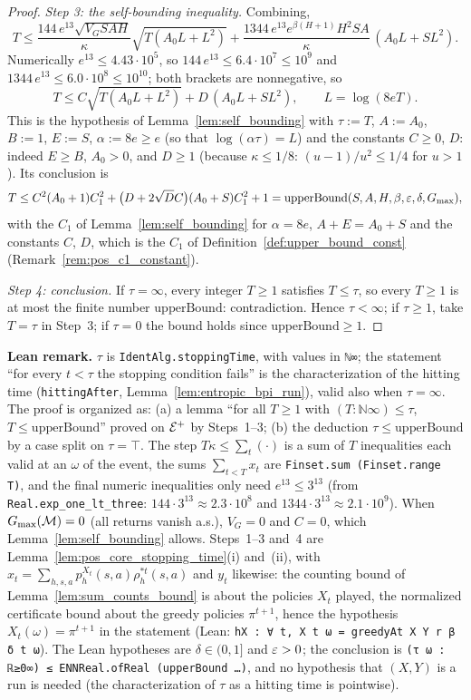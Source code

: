\begin{proof}
\emph{Step 3: the self-bounding inequality.} Combining,
\[
  T \le \frac{144\,e^{13}\sqrt{V_G SAH}}{\kappa}\sqrt{T(A_0L + L^2)}
     + \frac{1344\,e^{13}e^{\beta(H+1)}H^2SA}{\kappa}\,(A_0L + SL^2) .
\]
Numerically $e^{13} \le 4.43\cdot 10^5$, so $144\,e^{13} \le 6.4\cdot 10^7 \le 10^9$ and
$1344\,e^{13} \le 6.0\cdot 10^8 \le 10^{10}$; both brackets are nonnegative, so
\[
  T \le C\sqrt{T(A_0L + L^2)} + D\,(A_0L + SL^2), \qquad L = \log(8eT) .
\]
This is the hypothesis of Lemma~\ref{lem:self_bounding} with $\tau := T$, $A := A_0$, $B := 1$,
$E := S$, $\alpha := 8e \ge e$ (so that $\log(\alpha\tau) = L$) and the constants $C \ge 0$, $D$: indeed
$E \ge B$, $A_0 > 0$, and $D \ge 1$ (because $\kappa \le 1/8$: $(u - 1)/u^2 \le 1/4$ for $u > 1$).
Its conclusion is
\[
  T \le C^2(A_0 + 1)C_1^2 + \big(D + 2\sqrt{D}C\big)(A_0 + S)C_1^2 + 1 = \mathrm{upperBound}(S,A,H,\beta,\varepsilon,\delta,G_{\max}),
\]
with the $C_1$ of Lemma~\ref{lem:self_bounding} for $\alpha = 8e$, $A + E = A_0 + S$ and the constants
$C$, $D$, which is the $C_1$ of Definition~\ref{def:upper_bound_const} (Remark~\ref{rem:pos_c1_constant}).

\emph{Step 4: conclusion.} If $\tau = \infty$, every integer $T \ge 1$ satisfies $T \le \tau$, so every
$T \ge 1$ is at most the finite number $\mathrm{upperBound}$: contradiction. Hence $\tau < \infty$; if
$\tau \ge 1$, take $T = \tau$ in Step~3; if $\tau = 0$ the bound holds since $\mathrm{upperBound} \ge 1$.
\end{proof}

\textbf{Lean remark.} $\tau$ is \texttt{IdentAlg.stoppingTime}, with values in \texttt{ℕ∞}; the
statement ``for every $t < \tau$ the stopping condition fails'' is the characterization of the
hitting time (\texttt{hittingAfter}, Lemma~\ref{lem:entropic_bpi_run}), valid also when $\tau = \infty$.
The proof is organized as: (a) a lemma ``for all $T \ge 1$ with $(T : \texttt{ℕ∞}) \le \tau$,
$T \le \mathrm{upperBound}$'' proved on $\mathcal{E}^+$ by Steps~1--3; (b) the deduction $\tau \le \mathrm{upperBound}$
by a case split on $\tau = \top$. The step $T\kappa \le \sum_t(\cdot)$ is a sum of $T$ inequalities each
valid at an $\omega$ of the event, the sums $\sum_{t<T}x_t$ are \texttt{Finset.sum (Finset.range T)},
and the final numeric inequalities only need $e^{13} \le 3^{13}$ (from \texttt{Real.exp\_one\_lt\_three}:
$144 \cdot 3^{13} \approx 2.3\cdot 10^8$ and $1344 \cdot 3^{13} \approx 2.1\cdot 10^9$). When
$G_{\max}(\mathcal M) = 0$ (all returns vanish a.s.), $V_G = 0$ and $C = 0$, which Lemma~\ref{lem:self_bounding}
allows. Steps~1--3 and~4 are Lemma~\ref{lem:pos_core_stopping_time}(i) and~(ii), with
$x_t = \sum_{h,s,a}p^{X_t}_h(s,a)\rho^{*t}_h(s,a)$ and $y_t$ likewise: the counting bound of
Lemma~\ref{lem:sum_counts_bound} is about the policies $X_t$ played, the normalized certificate bound about
the greedy policies $\pi^{t+1}$, hence the hypothesis $X_t(\omega) = \pi^{t+1}$ in the statement (Lean:
\texttt{hX : ∀ t, X t ω = greedyAt X Y r β δ t ω}). The Lean hypotheses are $\delta \in (0, 1]$ and
$\varepsilon > 0$; the conclusion is \texttt{(τ ω : ℝ≥0∞) ≤ ENNReal.ofReal (upperBound …)}, and no hypothesis that
$(X, Y)$ is a run is needed (the characterization of $\tau$ as a hitting time is pointwise).

